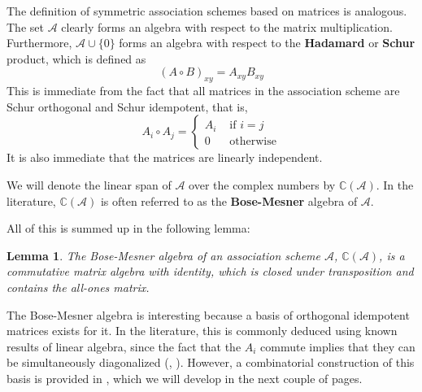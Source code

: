 \documentclass[a4paper,12pt]{article}
\theoremstyle{plain}
\newtheorem{lemma}[theorem]{Lemma}
\theoremstyle{definition}
\theoremstyle{remark}
\begin{document}
The definition of symmetric association schemes based on matrices is analogous.
\\
The set $ \mathcal{A} $ clearly forms an algebra with respect to
the matrix multiplication. Furthermore, $ \mathcal{A} \cup \{ 0 \} $ forms an
algebra with respect to the \textbf{Hadamard} or \textbf{Schur} product, which
is defined as
\[ (A \circ B)_{xy} = A_{xy}B_{xy} \]
This is immediate from the fact that all matrices in the association scheme are
Schur orthogonal and Schur idempotent, that is,
\[
    A_i \circ A_j = \begin{cases}
        A_i &\text{ if } i = j \\
        0 &\text{ otherwise}
    \end{cases}
\]
It is also immediate that the matrices are linearly independent.

We will denote the linear span of $ \mathcal{A} $ over the complex numbers by
$ \mathbb{C}(\mathcal{A}) $. In the literature, $ \mathbb{C}(\mathcal{A}) $ is
often referred to as the \textbf{Bose-Mesner} algebra of $ \mathcal{A} $.

All of this is summed up in the following lemma:

\begin{lemma}
    The Bose-Mesner algebra of an association scheme $ \mathcal{A} $,
    $ \mathbb{C}(\mathcal{A})  $, is a commutative matrix algebra with identity,
    which is closed under transposition and contains the all-ones matrix.
    \label{lm:ekr_bose_mesner}
\end{lemma}

The Bose-Mesner algebra is interesting because a basis of orthogonal idempotent
matrices exists for it. In the literature, this is commonly deduced using known
results of linear algebra, since the fact that the $ A_i $ commute implies that
they can be simultaneously diagonalized (\cite{brouwer_distance-regular_1989},
\cite{van_lint_course_2001}). However, a combinatorial construction of this
basis is provided in \cite{godsil_erdoskorado_2015}, which we will develop in
the next couple of pages.
\end{document}

